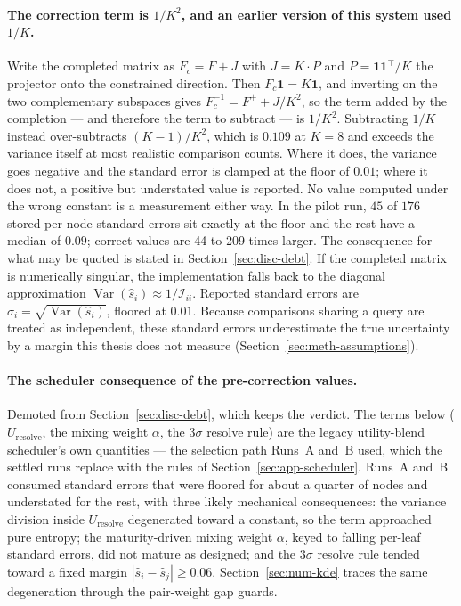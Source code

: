 \paragraph{The correction term is $1/K^{2}$, and an earlier version of
this system used $1/K$.}
Write the completed matrix as $F_c = F + J$ with $J = K \cdot P$ and
$P = \mathbf{1}\mathbf{1}^\top\!/K$ the projector onto the constrained
direction. Then $F_c \mathbf{1} = K \mathbf{1}$, and inverting on the
two complementary subspaces gives
$F_c^{-1} = F^{+} + J/K^{2}$, so the term added by the completion ---
and therefore the term to subtract --- is $1/K^{2}$.
Subtracting $1/K$ instead over-subtracts $(K-1)/K^{2}$, which is
$0.109$ at $K = 8$ and exceeds the variance itself at most realistic
comparison counts. Where it does, the variance goes negative and the
standard error is clamped at the floor of $0.01$; where it does not,
a positive but understated value is reported. No value computed under
the wrong constant is a measurement either way. In the pilot run,
$45$ of $176$ stored per-node standard errors sit exactly at the floor
and the rest have a median of $0.09$; correct values are 44 to 209
times larger. The consequence
for what may be quoted is stated in
Section~\ref{sec:disc-debt}.
If the completed matrix is numerically singular, the implementation
falls back to the diagonal approximation
$\operatorname{Var}(\hat{s}_i) \approx 1/\mathcal{I}_{ii}$.
Reported standard errors are
$\hat{\sigma}_i = \sqrt{\operatorname{Var}(\hat{s}_i)}$, floored at
$0.01$. Because comparisons sharing a query are treated as
independent, these standard errors underestimate the true uncertainty
by a margin this thesis does not measure
(Section~\ref{sec:meth-assumptions}).

\paragraph{The scheduler consequence of the pre-correction values.}
Demoted from Section~\ref{sec:disc-debt}, which keeps the verdict.
The terms below ($U_{\text{resolve}}$, the mixing weight $\alpha$,
the $3\sigma$ resolve rule) are the legacy utility-blend scheduler's
own quantities --- the selection path Runs~A and~B used, which the
settled runs replace with the rules of
Section~\ref{sec:app-scheduler}. Runs~A and~B consumed standard
errors that were floored for about a quarter of nodes and understated
for the rest, with three likely mechanical consequences: the variance
division inside $U_{\text{resolve}}$ degenerated toward a constant,
so the term
approached pure entropy; the maturity-driven mixing weight $\alpha$,
keyed to falling per-leaf standard errors, did not mature as designed;
and the $3\sigma$ resolve rule tended toward a fixed margin
$|\hat{s}_i - \hat{s}_j| \geq 0.06$. Section~\ref{sec:num-kde} traces
the same degeneration through the pair-weight gap guards.

